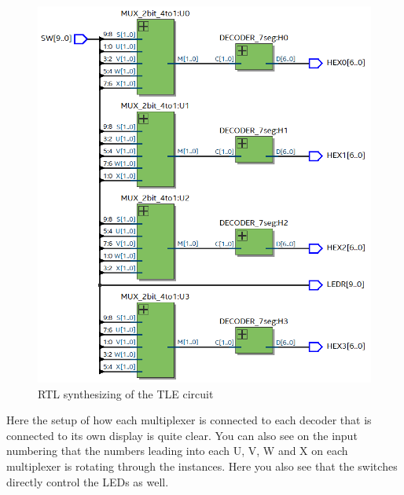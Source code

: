 \documentclass{article}
\begin{document}
\begin{figure}[h]
    \centering
    \includegraphics[width=1\textwidth]{Figures/Part5_TRL_TLE.png}
    \caption{RTL synthesizing of the TLE circuit}
    \label{fig:T05rtltle}
\end{figure}
Here the setup of how each multiplexer is connected to each decoder that is connected to its own display is quite clear. You can also see on the input numbering that the numbers leading into each U, V, W and X on each multiplexer is rotating through the instances. Here you also see that the switches directly control the LEDs as well.
\clearpage
\end{document}

